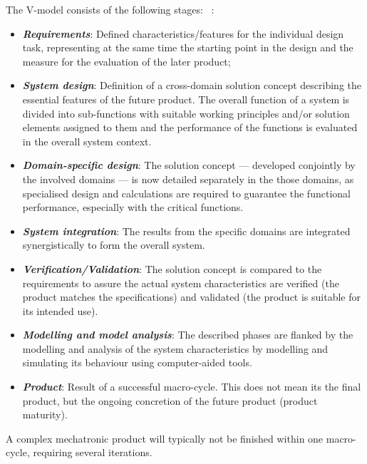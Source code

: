 The V-model consists of the following stages:
~\cite{gausemeier2003new}:
\begin{itemize}
  \item \textbf{\emph{Requirements}}: Defined characteristics/features for the
    individual design task, representing at the same time the starting point in
    the design and the measure for the evaluation of the later product;
  \item \textbf{\emph{System design}}: Definition of a cross-domain solution
    concept describing the essential features of the future product. The overall
    function of a system is divided into sub-functions with suitable working
    principles and/or solution elements assigned to them and the performance of
    the functions is evaluated in the overall system context.
  \item \textbf{\emph{Domain-specific design}}: The solution concept --- developed
    conjointly by the involved domains --- is now detailed separately in the those
    domains, as specialised design and calculations are required to guarantee
    the functional performance, especially with the critical functions. 
  \item \textbf{\emph{System integration}}: The results from the specific domains
    are integrated synergistically to form the overall system.
  \item \textbf{\emph{Verification/Validation}}: The solution concept is
    compared to the requirements to assure the actual system characteristics are
    verified (the product matches the specifications) and validated (the
    product is suitable for its intended use).
  \item \textbf{\emph{Modelling and model analysis}}: The described phases are
    flanked by the modelling and analysis of the system characteristics by
    modelling and simulating its behaviour using computer-aided tools.
  \item \textbf{\emph{Product}}: Result of a successful macro-cycle. This does
    not mean its the final product, but the ongoing concretion of the future
    product (product maturity).
\end{itemize}

A complex mechatronic product will typically not be finished within one
macro-cycle, requiring several iterations.

